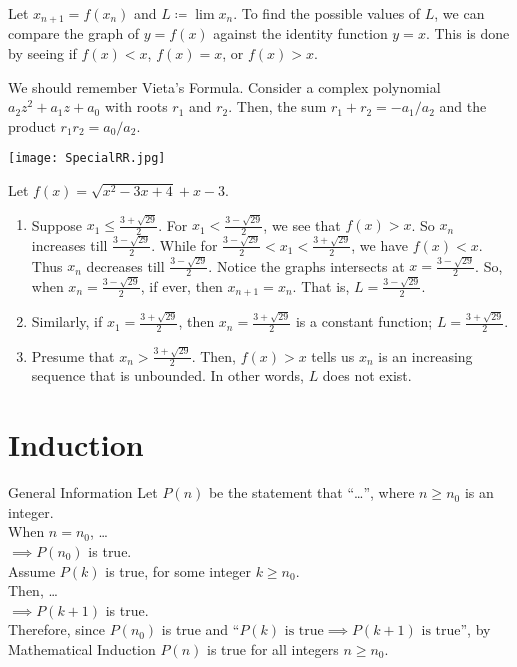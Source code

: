 \documentclass[oneside]{book}
\begin{document}
\begin{note}
  Let \(x_{n+1}=f(x_n)\) and \(L\coloneq \lim{x_n}\). To find the possible values of \(L\), we can compare the graph of \(y=f(x)\) against the identity function \(y=x\). This is done by seeing if \(f(x)<x\), \(f(x)=x\), or \(f(x)>x\).
\end{note}
\begin{note}\hypertarget{vieta}{}
  We should remember Vieta's Formula. Consider a complex polynomial \(a_2 z^2+a_1 z+a_0\) with roots \(r_1\) and \(r_2\). Then, the sum \(r_1+r_2=-a_1/a_2\) and the product \(r_1r_2=a_0/a_2\).
\end{note}
\begin{example}{}{}
  \begin{center}
    \texttt{[image: SpecialRR.jpg]}
  \end{center}
  Let \(f(x)=\sqrt{x^2-3x+4}+x-3\).
  \begin{enumerate}
    \item Suppose \(x_1 \leq \frac{3+\sqrt{29}}{2}\). For \(x_1<\frac{3-\sqrt{29}}{2}\), we see that \(f(x)>x\). So \(x_n\) increases till \(\frac{3-\sqrt{29}}{2}\). While for \(\frac{3-\sqrt{29}}{2}<x_1<\frac{3+\sqrt{29}}{2}\), we have \(f(x)<x\). Thus \(x_n\) decreases till \(\frac{3-\sqrt{29}}{2}\). Notice the graphs intersects at \(x=\frac{3-\sqrt{29}}{2}\). So, when \(x_n=\frac{3-\sqrt{29}}{2}\), if ever, then \(x_{n+1}=x_n\). That is, \(L=\frac{3-\sqrt{29}}{2}\).
    \item Similarly, if \(x_1=\frac{3+\sqrt{29}}{2}\), then \(x_n=\frac{3+\sqrt{29}}{2}\) is a constant function; \(L=\frac{3+\sqrt{29}}{2}\).
    \item Presume that \(x_n>\frac{3+\sqrt{29}}{2}\). Then, \(f(x)>x\) tells us \(x_n\) is an increasing sequence that is unbounded. In other words, \(L\) does not exist.
  \end{enumerate}
\end{example}

\chapter{Induction}
\begin{stbox}{General Information}
  Let \(P(n)\) be the statement that ``\ldots'', where \(n\geq n_0\) is an integer.\\[3mm] 
  When \(n=n_0\), \ldots\\[3mm]
  \(\implies P(n_0)\) is true.\\[3mm]
  Assume \(P(k)\) is true, for some integer \(k\geq n_0\).\\[3mm]
  Then, \ldots\\[3mm]
  \(\implies P(k+1)\) is true.\\[3mm]
  Therefore, since \(P(n_0)\) is true and ``\(P(k)\text{ is true}\implies P(k+1)\text{ is true}\)'', by Mathematical Induction \(P(n)\) is true for all integers \(n\geq n_0\).
\end{stbox}
\end{document}
